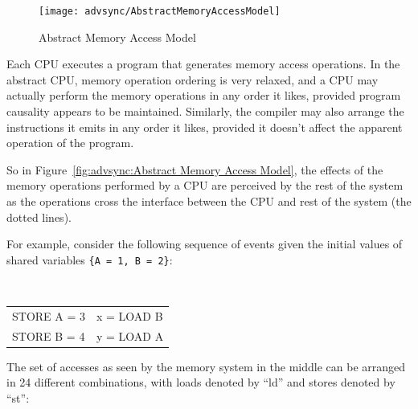 \begin{figure}[htb]
\centering
\texttt{[image: advsync/AbstractMemoryAccessModel]}
\caption{Abstract Memory Access Model}
\end{figure}

Each CPU executes a program that generates memory access operations.  In the
abstract CPU, memory operation ordering is very relaxed, and a CPU may actually
perform the memory operations in any order it likes, provided program causality
appears to be maintained.  Similarly, the compiler may also arrange the
instructions it emits in any order it likes, provided it doesn't affect the
apparent operation of the program.

So in Figure~\ref{fig:advsync:Abstract Memory Access Model},
the effects of the memory operations performed by a
CPU are perceived by the rest of the system as the operations cross the
interface between the CPU and rest of the system (the dotted lines).


For example, consider the following sequence of events given the
initial values of shared variables {\tt \{A~=~1, B~=~2\}}:

\vspace{5pt}
\begin{minipage}[t]{\columnwidth}
\tt
\scriptsize
\begin{tabular}{l|l}
	\nf{CPU 1} &	\nf{CPU 2} \\
	\hline
	STORE A = 3 &	x = LOAD B \\
	STORE B = 4 &	y = LOAD A \\
\end{tabular}
\end{minipage}
\vspace{5pt}

The set of accesses as seen by the memory system in the middle can be arranged
in 24 different combinations, with loads denoted by ``ld'' and stores
denoted by ``st'':

